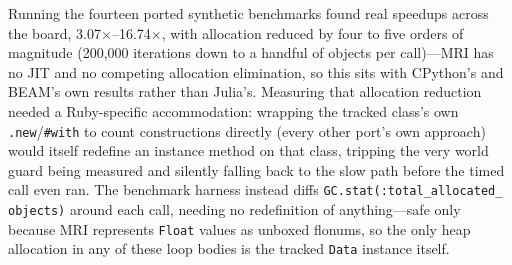 \documentclass[sigplan,screen,review,anonymous]{acmart}
\begin{document}
Running the fourteen ported synthetic benchmarks found real speedups
across the board, 3.07$\times$--16.74$\times$, with allocation reduced
by four to five orders of magnitude (200,000 iterations down to a
handful of objects per call)---MRI has no JIT and no competing
allocation elimination, so this sits with CPython's and BEAM's own
results rather than Julia's. Measuring that allocation reduction
needed a Ruby-specific accommodation: wrapping the tracked class's own
\texttt{.new}/\texttt{\#with} to count constructions directly (every
other port's own approach) would itself redefine an instance method on
that class, tripping the very world guard being measured and silently
falling back to the slow path before the timed call even ran. The
benchmark harness instead diffs \texttt{GC.stat(:total\_allocated\_}
\texttt{objects)} around each call, needing no redefinition of
anything---safe only because MRI represents \texttt{Float} values as
unboxed flonums, so the only heap allocation in any of these loop
bodies is the tracked \texttt{Data} instance itself.
\end{document}
